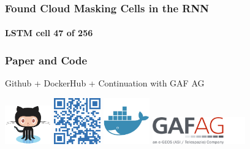 \begin{frame}
\frametitle{Found Cloud Masking Cells in the RNN}
\framesubtitle{LSTM cell \textbf{47} of 256}
\end{frame}
%
%	
%
%	


\begin{frame}[c]
\frametitle{Paper and Code}
\centering 


\large



Github + DockerHub + Continuation with GAF AG

\vspace{1ex}

\includegraphics[width=2cm]{images/github} \hspace{.5ex}
\includegraphics[width=2cm]{images/qr_github} \hspace{.5ex}
\includegraphics[width=2cm]{images/docker} \hspace{.5ex}
\vline
\hspace{.5ex}
\includegraphics[width=4cm]{images/gaf}


\end{frame}
